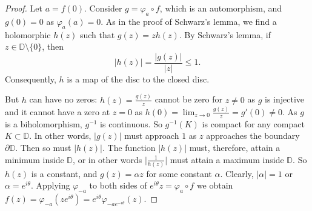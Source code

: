 \documentclass[12pt,openany]{book}
\newcommand{\sabs}[1]{\lvert {#1} \rvert}
\newcommand{\babs}[1]{\bigl\lvert {#1} \bigr\rvert}
\newcommand{\D}{{\mathbb{D}}}
\theoremstyle{plain}
\theoremstyle{remark}
\theoremstyle{definition}
\theoremstyle{exercise}
\theoremstyle{example}
\begin{document}
\begin{proof}
Let $a = f(0)$.
Consider $g = \varphi_a \circ f$, which is an automorphism,
and $g(0) = 0$ as
$\varphi_a(a) = 0$.
As in the proof of Schwarz's lemma, we find a holomorphic $h(z)$
such that $g(z) = z h(z)$.  By
Schwarz's lemma, if $z \in \D \setminus \{ 0 \}$, then
\begin{equation*}
\sabs{h(z)} = \frac{\sabs{g(z)}}{\sabs{z}} \leq 1 .
\end{equation*}
Consequently, $h$ is a map of the disc to the closed disc.

But $h$ can have no zeros:
$h(z) = \frac{g(z)}{z}$ cannot be zero for $z \not= 0$ as $g$ is injective
and it cannot have a zero at $z=0$
as $h(0) = \lim_{z\to 0} \frac{g(z)}{z} = g'(0) \not= 0$.  As $g$ is a biholomorphism, $g^{-1}$ is
continuous. So $g^{-1}(K)$ is compact for any compact $K \subset \D$.
In other words, $\sabs{g(z)}$ must approach $1$ as $z$
approaches the boundary $\partial \D$.
Then so must $\sabs{h(z)}$.
The function
$\sabs{h(z)}$ must, therefore, attain a minimum inside $\D$, or in other
words $\babs{\frac{1}{h(z)}}$ must attain a maximum inside $\D$.  So $h(z)$
is a constant, and $g(z) = \alpha z$ for some constant $\alpha$.
Clearly, 
$\sabs{\alpha} = 1$ or $\alpha = e^{i\theta}$.  Applying
$\varphi_{-a}$ to both sides of $e^{i\theta} z = \varphi_a \circ f$
we obtain
$f(z) = \varphi_{-a}(ze^{i\theta})
= e^{i \theta} \varphi_{-ae^{-i\theta}}(z)$.
\end{proof}
\end{document}
